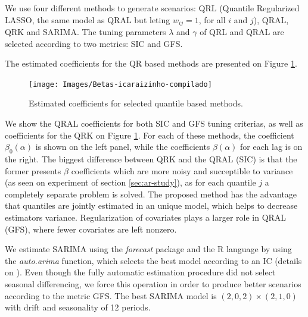 We use four different methods to generate scenarios: QRL (Quantile Regularized LASSO, the same model as QRAL but leting $w_{ij} = 1$, for all $i$ and $j$), QRAL, QRK and SARIMA. 
The tuning parameters $\lambda$ and $\gamma$ of QRL and QRAL are selected according to two metrics: SIC and GFS.

The estimated coefficients for the QR based methods are presented on Figure \ref{fig:betas-icaraizinho}. 
\begin{figure}[h]
	\centering
	\texttt{[image: Images/Betas-icaraizinho-compilado]}
	\caption{Estimated coefficients for selected quantile based methods.}
	\label{fig:betas-icaraizinho}
\end{figure}
We show the QRAL coefficients for both SIC and GFS tuning criterias, as well as coefficients for the QRK on Figure \ref{fig:betas-icaraizinho}. For each of these methods, the coefficient $\beta_0(\alpha)$ is shown on the left panel, while the coefficients $\beta(\alpha)$ for each lag is on the right.
The biggest difference between QRK and the QRAL (SIC) is that the former presents $\beta$ coefficients which are more noisy and succeptible to variance (as seen on experiment of section \ref{sec:ar-study}), as for each quantile $j$ a completely separate problem is solved. The proposed method has the advantage that quantiles are jointly estimated in an unique model, which helps to decrease estimators variance. Regularization of covariates plays a larger role in QRAL (GFS), where fewer covariates are left nonzero.

We estimate SARIMA using the \emph{forecast} \cite{hyndman2008forecastpackage} package and the R language by using the \emph{auto.arima} function, which selects the best model according to an IC (details on \cite{hyndman2008forecastmanual}). Even though the fully automatic estimation procedure did not select seasonal differencing, we force this operation in order to produce better scenarios according to the metric GFS. The best SARIMA model is $(2,0,2)\times(2,1,0)$ with drift and seasonality of 12 periods.


